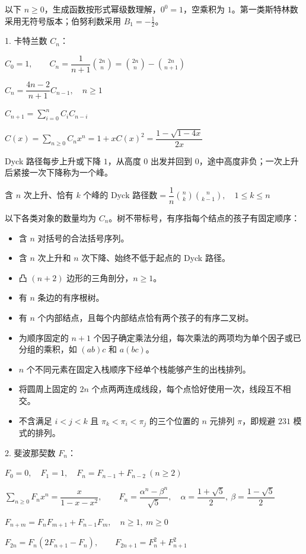 以下 $n\ge0$，生成函数按形式幂级数理解，$0^0=1$，空乘积为 $1$。第一类斯特林数采用无符号版本；伯努利数采用 $B_1=-\tfrac12$。

1. 卡特兰数 $C_n$：\nopagebreak[4]

$C_0=1,\qquad C_n=\dfrac1{n+1}\binom{2n}n=\binom{2n}n-\binom{2n}{n+1}$

$C_n=\dfrac{4n-2}{n+1}C_{n-1},\quad n\ge1$

$C_{n+1}=\displaystyle\sum_{i=0}^{n}C_iC_{n-i}$

$C(x)=\displaystyle\sum_{n\ge0}C_nx^n=1+xC(x)^2=\dfrac{1-\sqrt{1-4x}}{2x}$

Dyck 路径每步上升或下降 $1$，从高度 $0$ 出发并回到 $0$，途中高度非负；一次上升后紧接一次下降称为一个峰。

$\text{含 $n$ 次上升、恰有 $k$ 个峰的 Dyck 路径数}=\dfrac1n\binom nk\binom n{k-1},\quad1\le k\le n$

以下各类对象的数量均为 $C_n$。树不带标号，有序指每个结点的孩子有固定顺序：
\begin{itemize}
\item 含 $n$ 对括号的合法括号序列。
\item 含 $n$ 次上升和 $n$ 次下降、始终不低于起点的 Dyck 路径。
\item 凸 $(n+2)$ 边形的三角剖分，$n\ge1$。
\item 有 $n$ 条边的有序根树。
\item 有 $n$ 个内部结点，且每个内部结点恰有两个孩子的有序二叉树。
\item 为顺序固定的 $n+1$ 个因子确定乘法分组，每次乘法的两项均为单个因子或已分组的乘积，如 $(ab)c$ 和 $a(bc)$。
\item $n$ 个不同元素在固定入栈顺序下经单个栈能够产生的出栈排列。
\item 将圆周上固定的 $2n$ 个点两两连成线段，每个点恰好使用一次，线段互不相交。
\item 不含满足 $i<j<k$ 且 $\pi_k<\pi_i<\pi_j$ 的三个位置的 $n$ 元排列 $\pi$，即规避 $231$ 模式的排列。
\end{itemize}

2. 斐波那契数 $F_n$：\nopagebreak[4]

$F_0=0,\quad F_1=1,\quad F_n=F_{n-1}+F_{n-2}\ (n\ge2)$

$\displaystyle\sum_{n\ge0}F_nx^n=\dfrac{x}{1-x-x^2},\qquad F_n=\dfrac{\alpha^n-\beta^n}{\sqrt5},\quad\alpha=\dfrac{1+\sqrt5}2,\ \beta=\dfrac{1-\sqrt5}2$

$F_{n+m}=F_nF_{m+1}+F_{n-1}F_m,\quad n\ge1,\ m\ge0$

$F_{2n}=F_n(2F_{n+1}-F_n),\qquad F_{2n+1}=F_n^2+F_{n+1}^2$

